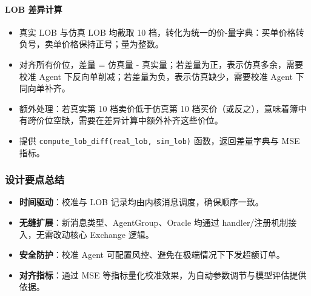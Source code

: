 \paragraph{LOB 差异计算}
\begin{itemize}
    \item 真实 LOB 与仿真 LOB 均截取 10 档，转化为统一的价-量字典：买单价格转负号，卖单价格保持正号；量为整数。
    \item 对齐所有价位，差量 = 仿真量 - 真实量；若差量为正，表示仿真多余，需要校准 Agent 下反向单削减；若差量为负，表示仿真缺少，需要校准 Agent 下同向单补齐。
    \item 额外处理：若真实第 10 档卖价低于仿真第 10 档买价（或反之），意味着簿中有跨价位空缺，需要在差异计算中额外补齐这些价位。
    \item 提供 \verb|compute_lob_diff(real_lob, sim_lob)| 函数，返回差量字典与 MSE 指标。
\end{itemize}

\subsubsection{设计要点总结}
\begin{itemize}
    \item \textbf{时间驱动}：校准与 LOB 记录均由内核消息调度，确保顺序一致。
    \item \textbf{无缝扩展}：新消息类型、AgentGroup、Oracle 均通过 handler/注册机制接入，无需改动核心 Exchange 逻辑。
    \item \textbf{安全防护}：校准 Agent 可配置风控、避免在极端情况下下发超额订单。
    \item \textbf{对齐指标}：通过 MSE 等指标量化校准效果，为自动参数调节与模型评估提供依据。
\end{itemize}
